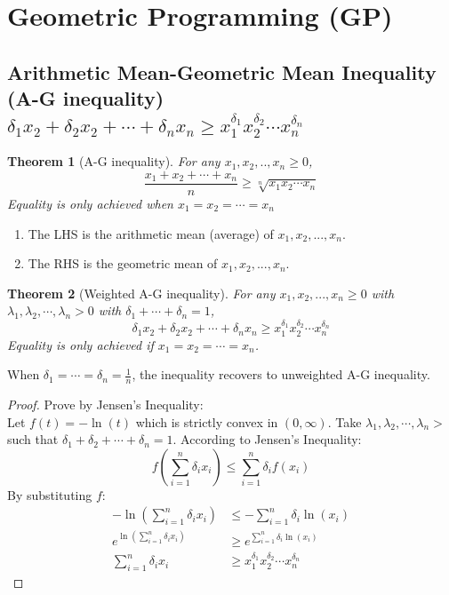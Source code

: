 \documentclass[11pt,a4paper]{article}
\newtheorem{theorem}{Theorem}
\begin{document}
\section{Geometric Programming (GP)}

\subsection{Arithmetic Mean-Geometric Mean Inequality (A-G inequality) $\delta_1x_2+\delta_2x_2+\cdots+\delta_nx_n\geq x_1^{\delta_1}x_2^{\delta_2}\cdots x_n^{\delta_n}$}
\begin{theorem}[A-G inequality]
For any $x_1,x_2,..,x_n\geq 0$, $$\frac{x_1+x_2+\cdots+x_n}{n}\geq \sqrt[n]{x_1x_2\cdots x_n}$$
Equality is only achieved when $x_1=x_2=\cdots=x_n$
\end{theorem}
\begin{enumerate}[$\bullet$]
    \item The LHS is the arithmetic mean (average) of $x_1,x_2,...,x_n$.
    \item The RHS is the geometric mean of $x_1,x_2,...,x_n$.
\end{enumerate}

\begin{theorem}[Weighted A-G inequality]
    For any $x_1,x_2,...,x_n\geq 0$ with $\lambda_1,\lambda_2,\cdots,\lambda_n>0$ with $\delta_1+\cdots+\delta_n=1$, $$\delta_1x_2+\delta_2x_2+\cdots+\delta_nx_n\geq x_1^{\delta_1}x_2^{\delta_2}\cdots x_n^{\delta_n}$$
    Equality is only achieved if $x_1=x_2=\cdots=x_n$.
\end{theorem}
When $\delta_1=\cdots=\delta_n=\frac{1}{n}$, the inequality recovers to unweighted A-G inequality.
\begin{proof}Prove by Jensen's Inequality:\\
    Let $f(t)=-\ln(t)$ which is strictly convex in $(0,\infty)$. Take $\lambda_1,\lambda_2,\cdots,\lambda_n>$ such that $\delta_1+\delta_2+\cdots+\delta_n=1$. According to Jensen's Inequality: $$f(\sum_{i=1}^n\delta_i x_i)\leq \sum_{i=1}^n\delta_i f(x_i)$$
    By substituting $f$:
    \begin{equation}
        \begin{aligned}
            -\ln(\sum_{i=1}^n\delta_i x_i)&\leq -\sum_{i=1}^n\delta_i \ln(x_i)\\
            e^{\ln(\sum_{i=1}^n\delta_i x_i)}&\geq e^{\sum_{i=1}^n\delta_i \ln(x_i)}\\
            \sum_{i=1}^n\delta_i x_i&\geq x_1^{\delta_1}x_2^{\delta_2}\cdots x_n^{\delta_n}
        \end{aligned}
        \nonumber
    \end{equation}
\end{proof}
\end{document}
